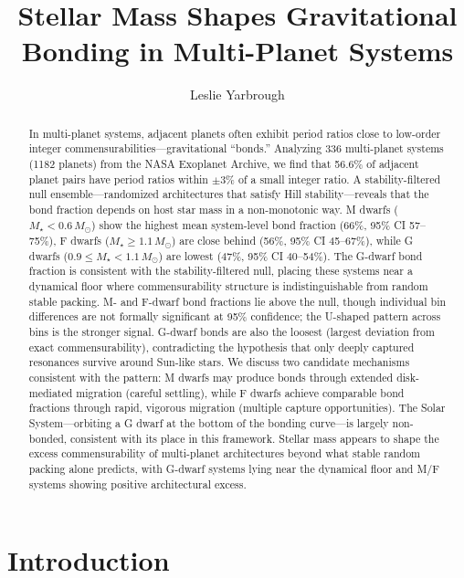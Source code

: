 \documentclass[twocolumn]{aastex631}
\begin{document}
\title{Stellar Mass Shapes Gravitational Bonding in Multi-Planet Systems}

\author{Leslie Yarbrough}

\graphicspath{{../figures/}}

\begin{abstract}
In multi-planet systems, adjacent planets often exhibit period ratios close to
low-order integer commensurabilities---gravitational ``bonds.'' Analyzing 336
multi-planet systems (1182 planets) from the NASA Exoplanet Archive, we find
that 56.6\% of adjacent planet pairs have period ratios within $\pm 3\%$ of a
small integer ratio. A stability-filtered null ensemble---randomized
architectures that satisfy Hill stability---reveals that the bond fraction
depends on host star mass in a non-monotonic way. M dwarfs
($M_\star < 0.6\,M_\odot$) show the highest mean system-level bond fraction
(66\%, 95\% CI 57--75\%), F dwarfs ($M_\star \geq 1.1\,M_\odot$) are close
behind (56\%, 95\% CI 45--67\%), while G dwarfs
($0.9 \leq M_\star < 1.1\,M_\odot$) are lowest (47\%, 95\% CI 40--54\%).
The G-dwarf bond fraction is consistent with the stability-filtered null,
placing these systems near a dynamical floor where commensurability structure
is indistinguishable from random stable packing. M- and F-dwarf bond fractions
lie above the null, though individual bin differences are not formally
significant at 95\% confidence; the U-shaped pattern across bins is the
stronger signal. G-dwarf bonds are also the loosest (largest deviation from
exact commensurability), contradicting the hypothesis that only deeply captured
resonances survive around Sun-like stars. We discuss two candidate mechanisms
consistent with the pattern: M dwarfs may produce bonds through extended
disk-mediated migration (careful settling), while F dwarfs achieve comparable
bond fractions through rapid, vigorous migration (multiple capture
opportunities). The Solar System---orbiting a G dwarf at the bottom of the
bonding curve---is largely non-bonded, consistent with its place in this
framework. Stellar mass appears to shape the excess commensurability of
multi-planet architectures beyond what stable random packing alone predicts,
with G-dwarf systems lying near the dynamical floor and M/F systems showing
positive architectural excess.
\end{abstract}

\section{Introduction}
\label{sec:intro}
\end{document}
